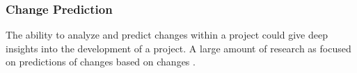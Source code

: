





\subsubsection{Change Prediction}

The ability to analyze and predict changes within a project could give deep insights into the development of a project. A large amount of research as focused on predictions of changes based on changes \cite{Bantelay2013, Chaturvedi2014, Giger2012, Hassan2004, Kagdi2007, Ying2004}.

